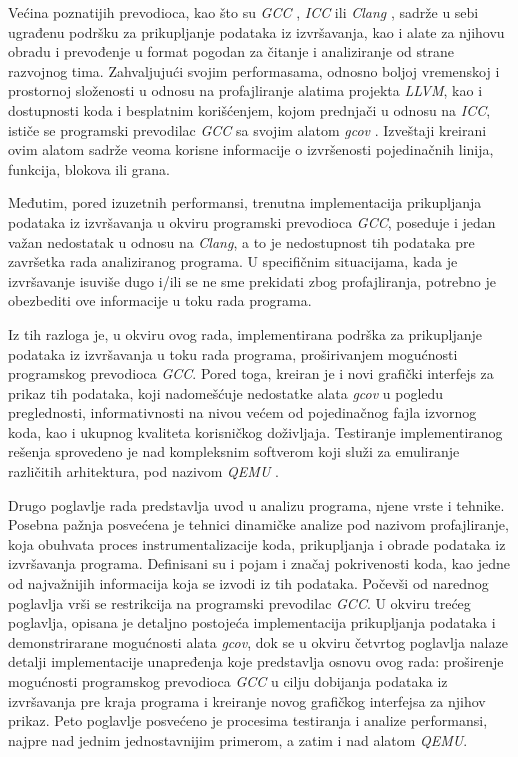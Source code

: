 \documentclass[12pt,oneside]{memoir}
\newcommand{\strano}[1]{\textit{#1}}
\begin{document}
Većina poznatijih prevodioca, kao što su \strano{GCC} \cite{GCC}, \strano{ICC} \cite{ICC} ili \strano{Clang} \cite{CLANG}, sadrže u sebi ugrađenu podršku za prikupljanje podataka iz izvršavanja, kao i alate za njihovu obradu i prevođenje u format pogodan za čitanje i analiziranje od strane razvojnog tima. Zahvaljujući svojim performasama, odnosno boljoj vremenskoj i prostornoj složenosti u odnosu na profajliranje alatima projekta \strano{LLVM}, kao i dostupnosti koda i besplatnim korišćenjem, kojom prednjači u odnosu na \strano{ICC}, ističe se programski prevodilac \strano{GCC} sa svojim alatom \strano{gcov} \cite{GCOV}. Izveštaji kreirani ovim alatom sadrže veoma korisne informacije o izvršenosti pojedinačnih linija, funkcija, blokova ili grana. 

Međutim, pored izuzetnih performansi, trenutna implementacija prikupljanja podataka iz izvršavanja u okviru programski prevodioca \strano{GCC}, poseduje i jedan važan nedostatak u odnosu na \strano{Clang}, a to je nedostupnost tih podataka pre završetka rada analiziranog programa. U specifičnim situacijama, kada je izvršavanje isuviše dugo i/ili se ne sme prekidati zbog profajliranja, potrebno je obezbediti ove informacije u toku rada programa.
 
Iz tih razloga je, u okviru ovog rada, implementirana podrška za prikupljanje podataka iz izvršavanja u toku rada programa, proširivanjem mogućnosti programskog prevodioca \strano{GCC}. Pored toga, kreiran je i novi grafički interfejs za prikaz tih podataka, koji nadomešćuje nedostatke alata \strano{gcov} u pogledu preglednosti, informativnosti na nivou većem od pojedinačnog fajla izvornog koda, kao i ukupnog kvaliteta korisničkog doživljaja. Testiranje implementiranog rešenja sprovedeno je nad kompleksnim softverom koji služi za emuliranje različitih arhitektura, pod nazivom \strano{QEMU} \cite{QEMU}. 

Drugo poglavlje rada predstavlja uvod u analizu programa, njene vrste i tehnike. Posebna pažnja posvećena je tehnici dinamičke analize pod nazivom profajliranje, koja obuhvata proces instrumentalizacije koda, prikupljanja i obrade podataka iz izvršavanja programa. Definisani su i pojam i značaj pokrivenosti koda, kao jedne od najvažnijih informacija koja se izvodi iz tih podataka. Počevši od narednog poglavlja vrši se restrikcija na programski prevodilac \strano{GCC}. U okviru trećeg poglavlja, opisana je detaljno postojeća implementacija prikupljanja podataka i demonstrirarane mogućnosti alata \strano{gcov}, dok se u okviru četvrtog poglavlja nalaze detalji implementacije unapređenja koje predstavlja osnovu ovog rada: proširenje mogućnosti programskog prevodioca \strano{GCC} u cilju dobijanja podataka iz izvršavanja pre kraja programa i kreiranje novog grafičkog interfejsa za njihov prikaz. Peto poglavlje posvećeno je procesima testiranja i analize performansi, najpre nad jednim jednostavnijim primerom, a zatim i nad alatom \strano{QEMU}. 
\end{document}
